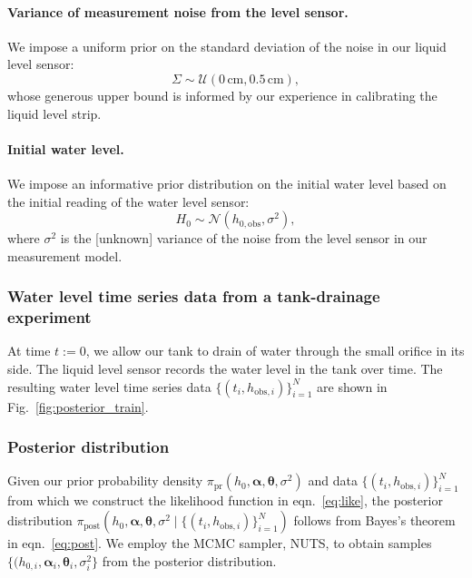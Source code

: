 \documentclass[openacc]{rsproca_new}%
\newcommand\thedata {$\{(t_i,h_{\text{obs}, i})\}_{i=1}^{N}$\xspace}
\newcommand\thedatanomath {\{(t_i,h_{\text{obs}, i})\}_{i=1}^{N}}
\begin{document}
\vspace{-\baselineskip}
\paragraph{Variance of measurement noise from the level sensor.}  
We impose a uniform prior on the standard deviation of the noise in our liquid level sensor:
\begin{equation}
\Sigma \sim \mathcal{U}(0\,\text{cm}, 0.5\,\text{cm}),
\end{equation} whose generous upper bound is informed by our experience in calibrating the liquid level strip. 

\vspace{-\baselineskip}
\paragraph{Initial water level.} We impose an informative prior distribution on the initial water level based on the initial reading of the water level sensor:
\begin{equation}
	H_0 \sim \mathcal{N}(h_{0, \text{obs}}, \sigma^2),
\end{equation} where $\sigma^2$ is the [unknown] variance of the noise from the level sensor in our measurement model.

\subsubsection{Water level time series data from a tank-drainage experiment} At time $t:=0$, we allow our tank to drain of water through the small orifice in its side. The liquid level sensor records the water level in the tank over time. The resulting water level time series data \thedata are shown in Fig.~\ref{fig:posterior_train}.

\subsubsection{Posterior distribution}
Given our prior probability density $\pi_{\text{pr}}(h_0, \boldsymbol \alpha, \boldsymbol \theta, \sigma^2)$ and data \thedata from which we construct the likelihood function in eqn.~\ref{eq:like}, the posterior distribution $\pi_{\text{post}}(h_0, \boldsymbol \alpha, \boldsymbol \theta, \sigma^2 \mid \thedatanomath)$ follows from Bayes's theorem in eqn.~\ref{eq:post}. 
We employ the MCMC sampler, NUTS, to obtain samples $\{(h_{0,i}, \boldsymbol \alpha_i, \boldsymbol \theta_i, \sigma^2_i\}$ from the posterior distribution. 
\end{document}
